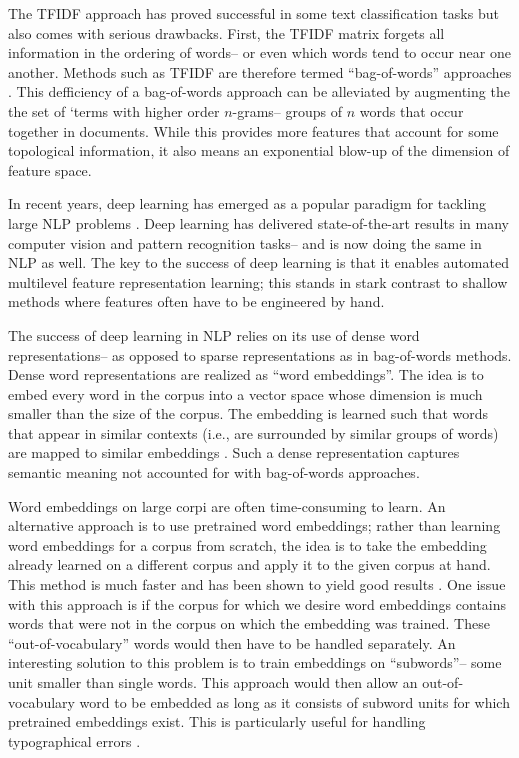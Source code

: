\documentclass[12pt]{article}
\begin{document}
The TFIDF approach has proved successful in some text classification tasks \cite{tong2001support} but also comes with serious drawbacks. First, the TFIDF matrix forgets all information in the ordering of words-- or even which words tend to occur near one another. Methods such as TFIDF are therefore termed ``bag-of-words'' approaches \cite{joulin2016bag, sebastiani2002machine}. This defficiency of a bag-of-words approach can be alleviated by augmenting the the set of `terms with higher order $n$-grams-- groups of $n$ words that occur together in documents. While this provides more features that account for some topological information, it also means an exponential blow-up of the dimension of feature space.

In recent years, deep learning has emerged as a popular paradigm for tackling large NLP problems \cite{young2017recent}. Deep learning has delivered state-of-the-art results in many computer vision and pattern recognition tasks-- and is now doing the same in NLP as well. The key to the success of deep learning is that it enables automated multilevel feature representation learning; this stands in stark contrast to shallow methods where features often have to be engineered by hand.

The success of deep learning in NLP relies on its use of dense word representations-- as opposed to sparse representations as in bag-of-words methods. Dense word representations are realized as ``word embeddings''. The idea is to embed every word in the corpus into a vector space whose dimension is much smaller than the size of the corpus. The embedding is learned such that words that appear in similar contexts (i.e., are surrounded by similar groups of words) are mapped to similar embeddings \cite{mikolov2013distributed}. Such a dense representation captures semantic meaning not accounted for with bag-of-words approaches.

Word embeddings on large corpi are often time-consuming to learn. An alternative approach is to use pretrained word embeddings; rather than learning word embeddings for a corpus from scratch, the idea is to take the embedding already learned on a different corpus and apply it to the given corpus at hand. This method is much faster and has been shown to yield good results \cite{labutov2013re}. One issue with this approach is if the corpus for which we desire word embeddings contains words that were not in the corpus on which the embedding was trained. These ``out-of-vocabulary'' words would then have to be handled separately. An interesting solution to this problem is to train embeddings on ``subwords''-- some unit smaller than single words. This approach would then allow an out-of-vocabulary word to be embedded as long as it consists of subword units for which pretrained embeddings exist. This is particularly useful for handling typographical errors \cite{bojanowski2016enriching}.
\end{document}

